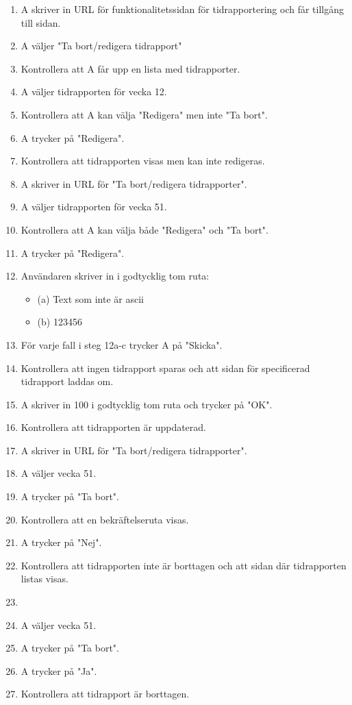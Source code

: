 \documentclass[a4paper]{article}
\begin{document}
\begin{ST}
\begin{enumerate}
\item A skriver in URL för funktionalitetssidan för tidrapportering och får tillgång till sidan.
\item A väljer "Ta bort/redigera tidrapport"
\item Kontrollera att A får upp en lista med tidrapporter.
\item A väljer tidrapporten för vecka 12.
\item Kontrollera att A kan välja "Redigera" men inte "Ta bort".
\item A trycker på "Redigera".
\item Kontrollera att tidrapporten visas men kan inte redigeras.
\item A skriver in URL för "Ta bort/redigera tidrapporter".
\item A väljer tidrapporten för vecka 51.
\item Kontrollera att A kan välja både "Redigera" och "Ta bort".
\item A trycker på "Redigera".
\item Användaren skriver in i godtycklig tom ruta:
\begin{itemize}
\item[] (a) Text som inte är ascii
\item[] (b) 123456
\end{itemize}
\item För varje fall i steg 12a-c trycker A på "Skicka". 
\item Kontrollera att ingen tidrapport sparas och att sidan för specificerad tidrapport laddas om.
\item A skriver in 100 i godtycklig tom ruta och trycker på "OK".
\item Kontrollera att tidrapporten är uppdaterad.
\item A skriver in URL för "Ta bort/redigera tidrapporter".
\item A väljer vecka 51.
\item A trycker på "Ta bort".
\item Kontrollera att en bekräftelseruta visas.
\item A trycker på "Nej".
\item Kontrollera att tidrapporten inte är borttagen och att sidan där tidrapporten listas visas.
\item \item A väljer vecka 51.
\item A trycker på "Ta bort".
\item A trycker på "Ja".
\item Kontrollera att tidrapport är borttagen.
\end{enumerate}



\end{ST}
\end{document}

